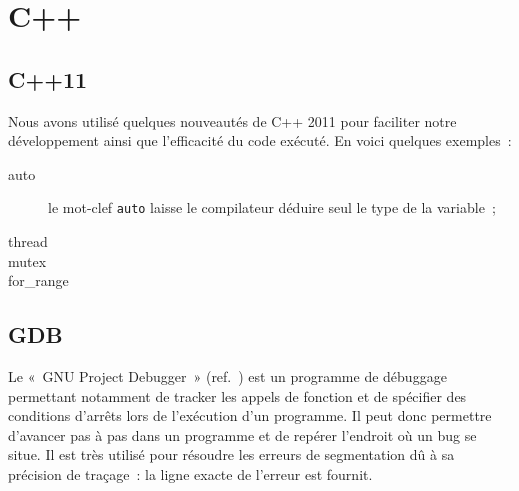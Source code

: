\section{C++}

\subsection{C++11}
Nous avons utilisé quelques nouveautés de C++ 2011 pour faciliter notre développement ainsi que l'efficacité du code exécuté. En voici quelques exemples~:
\begin{description}
\item[auto] le mot-clef \verb|auto| laisse le compilateur déduire seul le type de la variable~;
\item[thread]
\item[mutex]
\item[for\_range]
\end{description}

\subsection{GDB}
Le «~GNU Project Debugger~» (ref.~\cite{gdb}) est un programme de débuggage permettant notamment de tracker les appels de fonction et de spécifier des conditions d'arrêts lors de l'exécution d'un programme. Il peut donc permettre d'avancer pas à pas dans un programme et de repérer l'endroit où un bug se situe. Il est très utilisé pour résoudre les erreurs de segmentation dû à sa précision de traçage~: la ligne exacte de l'erreur est fournit.
